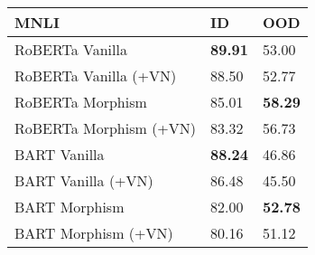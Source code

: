 \begin{tabularx}{1.2\linewidth}{ l *{2}{Z} }
\hline
\textbf{MNLI} & \textbf{ID}& \textbf{OOD} \\
\hline
RoBERTa Vanilla  & \textbf{89.91} & 53.00 \\
RoBERTa Vanilla (+VN) & 88.50 & 52.77 \\
RoBERTa Morphism  & 85.01 & \textbf{58.29} \\
RoBERTa Morphism (+VN) & 83.32 & 56.73 \\
\hline
BART Vanilla  & \textbf{88.24} & 46.86   \\
BART Vanilla (+VN) & 86.48 & 45.50  \\
BART Morphism  &  82.00 & \textbf{52.78} \\
BART Morphism (+VN) &  80.16 & 51.12   \\
\hline
\end{tabularx}